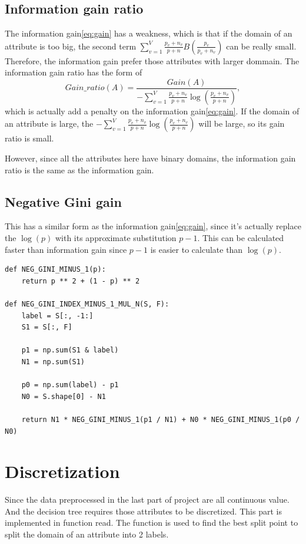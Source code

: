 \documentclass[UTF8, a4paper, 11pt]{article}
\begin{document}
\subsection{Information gain ratio}
The information gain\ref{eq:gain} has a weakness, which is that if the domain of an attribute is too big, the second term $\sum_{v=1}^V\frac{p_v+n_v}{p+n}B(\frac{p_v}{p_v+n_v})$ can be really small.
Therefore, the information gain prefer those attributes with larger dommain.
The information gain ratio has the form of
\begin{equation}
	Gain\_ratio(A)=\frac{Gain(A)}{-\sum_{v=1}^V\frac{p_v+n_v}{p+n}\log(\frac{p_v+n_v}{p+n})},
\end{equation}
which is actually add a penalty on the information gain\ref{eq:gain}.
If the domain of an attribute is large, the $-\sum_{v=1}^V\frac{p_v+n_v}{p+n}\log(\frac{p_v+n_v}{p+n})$ will be large, so its gain ratio is small.

However, since all the attributes here have binary domains, the information gain ratio is the same as the information gain.
\subsection{Negative Gini gain}
This has a similar form as the information gain\ref{eq:gain}, since it's actually replace the $\log(p)$ with its approximate substitution $p-1$.
This can be calculated faster than information gain since $p-1$ is easier to calculate than $\log(p)$.
\begin{lstlisting}
def NEG_GINI_MINUS_1(p):
    return p ** 2 + (1 - p) ** 2

def NEG_GINI_INDEX_MINUS_1_MUL_N(S, F):
    label = S[:, -1:]
    S1 = S[:, F]

    p1 = np.sum(S1 & label)
    N1 = np.sum(S1)

    p0 = np.sum(label) - p1
    N0 = S.shape[0] - N1

    return N1 * NEG_GINI_MINUS_1(p1 / N1) + N0 * NEG_GINI_MINUS_1(p0 / N0)
\end{lstlisting}
\section{Discretization}
Since the data preprocessed in the last part of project are all continuous value.
And the decision tree requires those attributes to be discretized.
This part is implemented in function read.
The function is used to find the best split point to split the domain of an attribute into 2 labels.
\end{document}
